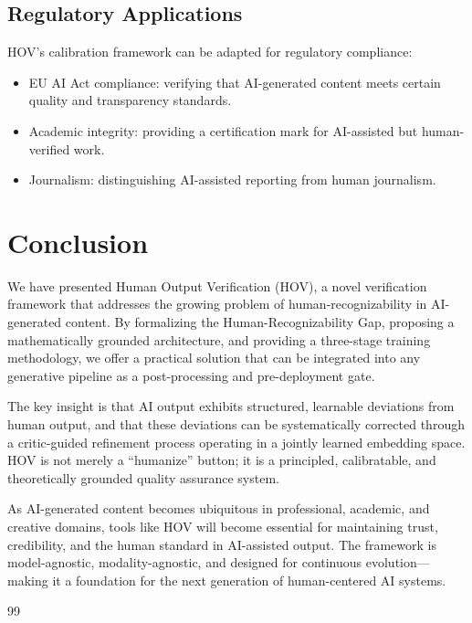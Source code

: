 \documentclass[12pt,oneside]{article}
\begin{document}
{{{{{{{{{{{\subsection{Regulatory Applications}

HOV's calibration framework can be adapted for regulatory compliance:
\begin{itemize}[noitemsep]
    \item EU AI Act compliance: verifying that AI-generated content meets certain quality and transparency standards.
    \item Academic integrity: providing a certification mark for AI-assisted but human-verified work.
    \item Journalism: distinguishing AI-assisted reporting from human journalism.
\end{itemize}

\section{Conclusion}

We have presented Human Output Verification (HOV), a novel verification framework that addresses the growing problem of human-recognizability in AI-generated content. By formalizing the Human-Recognizability Gap, proposing a mathematically grounded architecture, and providing a three-stage training methodology, we offer a practical solution that can be integrated into any generative pipeline as a post-processing and pre-deployment gate.

The key insight is that AI output exhibits structured, learnable deviations from human output, and that these deviations can be systematically corrected through a critic-guided refinement process operating in a jointly learned embedding space. HOV is not merely a ``humanize'' button; it is a principled, calibratable, and theoretically grounded quality assurance system.

As AI-generated content becomes ubiquitous in professional, academic, and creative domains, tools like HOV will become essential for maintaining trust, credibility, and the human standard in AI-assisted output. The framework is model-agnostic, modality-agnostic, and designed for continuous evolution---making it a foundation for the next generation of human-centered AI systems.

\newpage
\begin{thebibliography}{99}


\end{thebibliography}}}}}}}}}}}}
\end{document}

